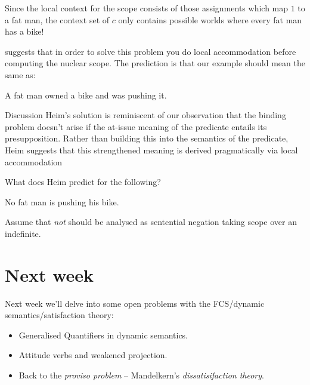 \documentclass[cronos,landscape,paper=letter]{ling-handout}
\begin{document}
  Since the local context for the scope consists of those assignments which map \(1\) to a fat man, the context set of \(c\) only contains possible worlds where every fat man has a bike!

  \citet{heim1983} suggests that in order to solve this problem you do local accommodation before computing the nuclear scope. The prediction is that our example should mean the same as:

  \ex
A fat man owned a bike and was pushing it.
  \xe

  \begin{tcolorbox}
    Discussion
    \tcblower
    Heim's solution is reminiscent of our observation that the binding problem doesn't arise if the at-issue meaning of the predicate entails its presupposition. Rather than building this into the semantics of the predicate, Heim suggests that this strengthened meaning is derived pragmatically via local accommodation

    What does Heim predict for the following?

    \ex
    No fat man is pushing his bike.
    \xe
    \vspace{1ex}

    Assume that \textit{not} should be analysed as sentential negation taking scope over an indefinite.

  \end{tcolorbox}

  \section{Next week}

  Next week we'll delve into some open problems with the FCS/dynamic semantics/satisfaction theory:

  \begin{itemize}

      \item Generalised Quantifiers in dynamic semantics.

    \item Attitude verbs and weakened projection.

     \item Back to the \textit{proviso problem} -- Mandelkern's \textit{dissatisifaction theory}.

  \end{itemize}


\end{document}
